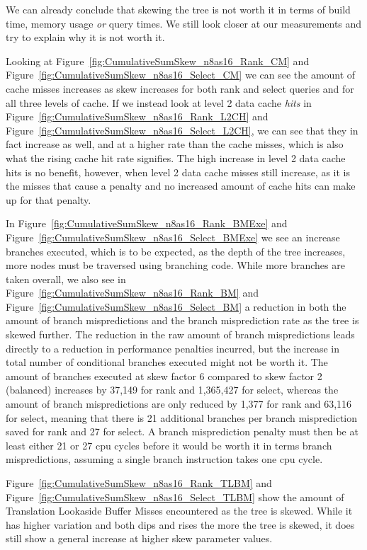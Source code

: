We can already conclude that skewing the tree is not worth it in terms of build time, memory usage \textit{or} query times.
We still look closer at our measurements and try to explain why it is not worth it.

Looking at Figure~\ref{fig:CumulativeSumSkew_n8as16_Rank_CM} and Figure~\ref{fig:CumulativeSumSkew_n8as16_Select_CM} we can see the amount of cache misses increases as skew increases for both rank and select queries and for all three levels of cache.
If we instead look at level 2 data cache \textit{hits} in Figure~\ref{fig:CumulativeSumSkew_n8as16_Rank_L2CH} and Figure~\ref{fig:CumulativeSumSkew_n8as16_Select_L2CH}, we can see that they in fact increase as well, and at a higher rate than the cache misses, which is also what the rising cache hit rate signifies.
The high increase in level 2 data cache hits is no benefit, however, when level 2 data cache misses still increase, as it is the misses that cause a penalty and no increased amount of cache hits can make up for that penalty.

In Figure~\ref{fig:CumulativeSumSkew_n8as16_Rank_BMExe} and Figure~\ref{fig:CumulativeSumSkew_n8as16_Select_BMExe} we see an increase branches executed, which is to be expected, as the depth of the tree increases, more nodes must be traversed using branching code.
While more branches are taken overall, we also see in Figure~\ref{fig:CumulativeSumSkew_n8as16_Rank_BM} and Figure~\ref{fig:CumulativeSumSkew_n8as16_Select_BM} a reduction in both the amount of branch mispredictions and the branch misprediction rate as the tree is skewed further.
The reduction in the raw amount of branch mispredictions leads directly to a reduction in performance penalties incurred, but the increase in total number of conditional branches executed might not be worth it.
The amount of branches executed at skew factor 6 compared to skew factor 2 (balanced) increases by 37,149 for rank and 1,365,427 for select, whereas the amount of branch mispredictions are only reduced by 1,377 for rank and 63,116 for select, meaning that there is 21 additional branches per branch misprediction saved for rank and 27 for select.
A branch misprediction penalty must then be at least either 21 or 27 cpu cycles before it would be worth it in terms branch mispredictions, assuming a single branch instruction takes one cpu cycle.

Figure~\ref{fig:CumulativeSumSkew_n8as16_Rank_TLBM} and Figure~\ref{fig:CumulativeSumSkew_n8as16_Select_TLBM} show the amount of Translation Lookaside Buffer Misses encountered as the tree is skewed.
While it has higher variation and both dips and rises the more the tree is skewed, it does still show a general increase at higher skew parameter values.

